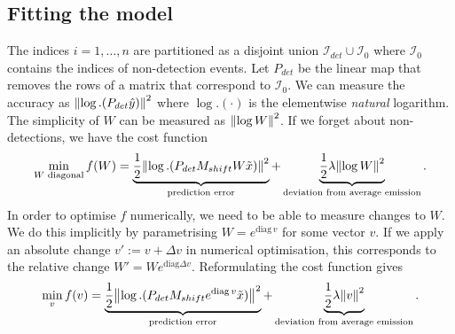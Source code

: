 \documentclass{article}
\begin{document}
\subsection{Fitting the model}
The indices $i = 1,\dots,n$ are partitioned as a disjoint union $\mathcal{I}_{det} \cup \mathcal{I}_{0}$ where $\mathcal{I}_0$ contains the indices of non-detection events. Let $P_{det}$ be the linear map that removes the rows of a matrix that correspond to $\mathcal{I}_0$. We can measure the accuracy as $\norm{\log.(P_{det} \hat{y})}^2$ where $\log.(\cdot)$ is the elementwise \emph{natural} logarithm. The simplicity of $W$ can be measured as $\norm{\log W}^2$. If we forget about non-detections, we have the cost function 
$$
\min_{W \text{ diagonal}} f(W) =
\underbrace{\frac{1}{2}\norm{\log.(P_{det} M_{shift} W \tilde{x})}^2}_{\text{prediction error}} + \underbrace{\frac{1}{2}\lambda \norm{\log W}^2}_{\text{deviation from average emission}}
.$$
In order to optimise $f$ numerically, we need to be able to measure changes to $W$. We do this implicitly by parametrising $W = e^{\mathrm{diag}\, v}$ for some vector $v$. If we apply an absolute change $v' := v + \Delta v$ in numerical optimisation, this corresponds to the relative change $W' = W e^{\mathrm{diag} \Delta v}$. 
Reformulating the cost function gives 
$$
\min_{v} f(v) =
\underbrace{\frac{1}{2}\norm{\log.(P_{det} M_{shift} e^{\mathrm{diag}\, v} \tilde{x})}^2}_{\text{prediction error}} + \underbrace{\frac{1}{2}\lambda \norm{v}^2}_{\text{deviation from average emission}}
.$$
\end{document}
